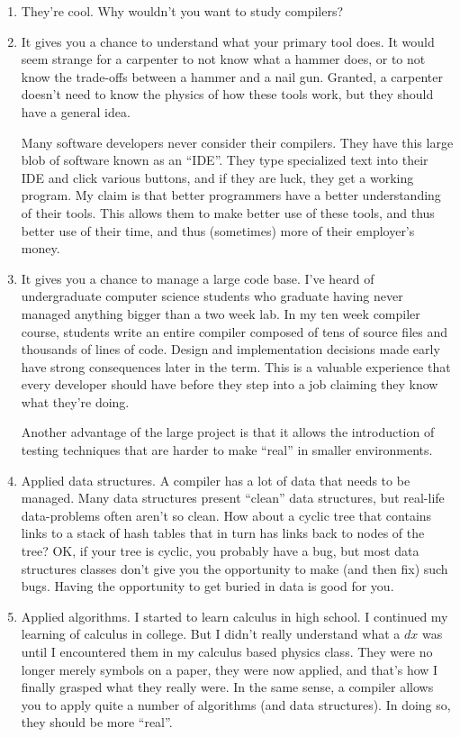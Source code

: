 \documentclass[letterpaper,12pt,openany,reqno]{book}%
\begin{document}
\begin{enumerate}
\item They're cool. Why wouldn't you want to study compilers?
\item It gives you a chance to understand what your primary tool does. It would seem strange for a carpenter to not know what a hammer does, or to not know the trade-offs between a hammer and a nail gun. Granted, a carpenter doesn't need to know the physics of how these tools work, but they should have a general idea. 

Many software developers never consider their compilers. They have this large blob of software known as an ``IDE''. They type specialized text into their IDE and click various buttons, and if they are luck, they get a working program. My claim is that better programmers have a better understanding of their tools. This allows them to make better use of these tools, and thus better use of their time, and thus (sometimes) more of their employer's money.

\item It gives you a chance to manage a large code base. I've heard of undergraduate computer science students who graduate having never managed anything bigger than a two week lab. In my ten week compiler course, students write an entire compiler composed of tens of source files and thousands of lines of code. Design and implementation decisions made early have strong consequences later in the term. This is a valuable experience that every developer should have before they step into a job claiming they know what they're doing.

Another advantage of the large project is that it allows the introduction of testing techniques that are harder to make ``real'' in smaller environments.

\item Applied data structures. A compiler has a lot of data that needs to be managed. Many data structures present ``clean'' data structures, but real-life data-problems often aren't so clean. How about a cyclic tree that contains links to a stack of hash tables that in turn has links back to nodes of the tree? OK, if your tree is cyclic, you probably have a bug, but most data structures classes don't give you the opportunity to make (and then fix) such bugs. Having the opportunity to get buried in data is good for you.

\item Applied algorithms. I started to learn calculus in high school. I continued my learning of calculus in college. But I didn't really understand what a $dx$ was until I encountered them in my calculus based physics class. They were no longer merely symbols on a paper, they were now applied, and that's how I finally grasped what they really were. In the same sense, a compiler allows you to apply quite a number of algorithms (and data structures). In doing so, they should be more ``real''.


\end{enumerate}
\end{document}
